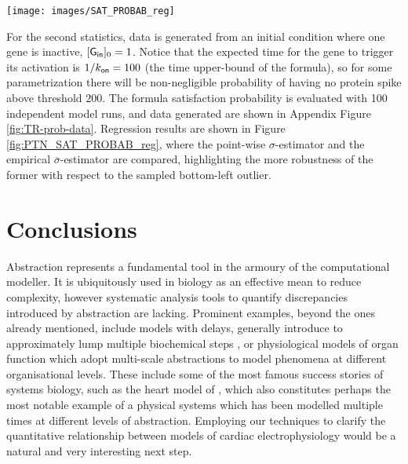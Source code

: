 \documentclass[runningheads,a4paper]{llncs}
\newcommand{\tstat}{\eta} %
\newcommand{\GEI}{{\sf{G}_{\text{\sf in}}}}
\begin{document}
 \begin{SCfigure}[][t]
\texttt{[image: images/SAT\_PROBAB\_reg]}
\caption{Correction map for the expected satisfaction probability of the linear logic formula $\tstat_2$ in eq. (\ref{eq:stat-PTN}). Comparison between the point-wise $\sigma$-estimator and the empirical $\overline{\sigma}$-estimator. Sampled data are shown in Appendix Figure \ref{fig:TR-prob-data}.}
\label{fig:PTN_SAT_PROBAB_reg}
\end{SCfigure}
 
For the second statistics, data is generated from an initial condition where one gene is inactive, $[\GEI]_0=1$. Notice that the expected time for the gene to trigger its activation is $1/k_{\text{\sf on}} = 100$ (the time upper-bound of the formula), so for some parametrization there will be non-negligible probability of having no protein spike above threshold $200$. The formula satisfaction probability is evaluated with 100 independent model runs, and data generated are shown in Appendix Figure \ref{fig:TR-prob-data}. Regression results are shown in Figure \ref{fig:PTN_SAT_PROBAB_reg}, where the point-wise $\sigma$-estimator and the empirical $\overline{\sigma}$-estimator are compared, highlighting the more robustness of the former with respect to the sampled bottom-left outlier.


\section{Conclusions}

Abstraction represents a fundamental tool in the armoury of the computational modeller. It is ubiquitously used in biology as an effective mean to reduce complexity, however systematic analysis tools to quantify discrepancies introduced by abstraction are lacking. Prominent examples, beyond the ones already mentioned, include models with delays, generally introduce to approximately lump multiple biochemical steps \cite{caravagna2011formal}, or physiological models of organ function which adopt multi-scale abstractions to model phenomena at different organisational levels. These include some of the most famous success stories of systems biology, such as the heart model of \cite{noble2002modeling}, which also constitutes perhaps the most notable example of a physical systems which has been modelled multiple times at different levels of abstraction. Employing our techniques to clarify the quantitative relationship between models of cardiac electrophysiology would be a natural and very interesting next step.
\end{document}
